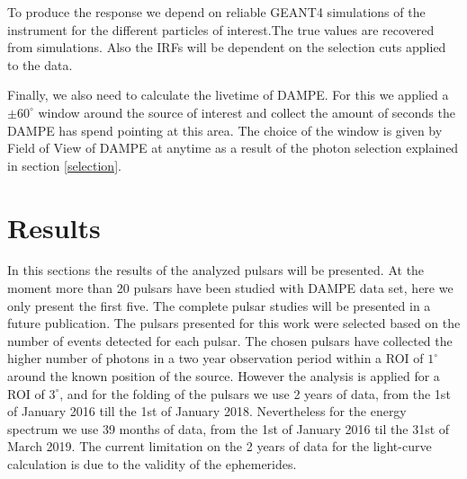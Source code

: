 \documentclass{PoS}
\begin{document}
To produce the response we depend on reliable GEANT4 simulations of the instrument for the  different particles of interest.The true values are recovered from simulations. Also the IRFs will be dependent on the selection cuts applied to the data. 





Finally, we also need to calculate the livetime of DAMPE. For this we applied a $ \pm 60^{\circ}$ window around the source of interest and collect the amount of seconds the DAMPE has spend pointing at this area. The choice of the window is given by  Field of View of DAMPE at anytime as a result of the photon selection explained in section \ref{selection}.


\section{Results}
In this  sections  the  results of the analyzed pulsars will be presented. At the moment more than 20 pulsars have been  studied with DAMPE data set, here we only present the first five. The complete pulsar studies will be presented in a future publication.  The pulsars presented for this work were selected based on the number of events detected for each pulsar. The chosen pulsars have collected the higher number of photons in a  two year observation period within a ROI of $1^\circ$ around the known position of the source. However the analysis is applied  for a ROI of $3^\circ$, and for the folding of the pulsars we use 2 years of data, from the 1st of January 2016 till the 1st of January 2018.  Nevertheless for the  energy spectrum we use 39 months of data, from the 1st of January 2016 til the  31st of March 2019. The current limitation on the 2 years of data for the  light-curve calculation is due to the validity of the ephemerides.
\end{document}
